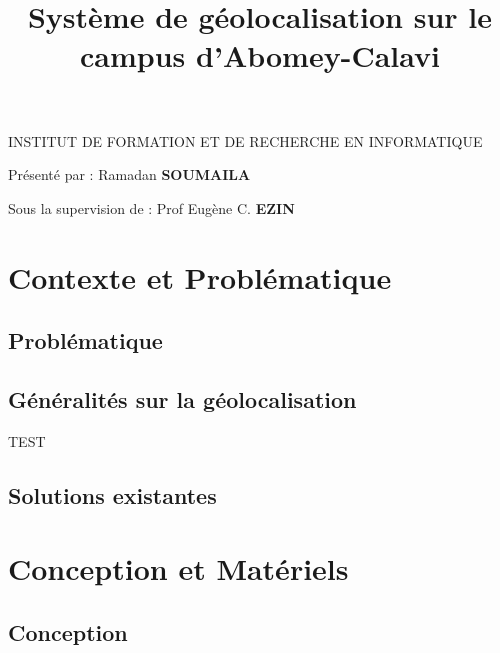 \documentclass[11pt]{beamer}
\author[Ramadan SOUMAILA]{}
\title{Système de géolocalisation sur le campus d'Abomey-Calavi}
\institute{}
\date{}
\begin{document}
\begin{frame}
	\begin{center}
		\begin{large}
			INSTITUT DE FORMATION ET DE RECHERCHE EN INFORMATIQUE
		\end{large}
	\end{center}
	\begin{center}
		\titlepage
	\end{center}
	\begin{center}
		Présenté par : Ramadan \textbf{SOUMAILA}
	\end{center}
	\begin{center}
		Sous la supervision de : Prof Eugène C. \textbf{EZIN}
	\end{center}
\end{frame}
	\section{Contexte et Problématique}
		\subsection{Problématique}
			\begin{frame}
			
			\end{frame}
		\subsection{Généralités sur la géolocalisation}
			\begin{frame}
					TEST
			\end{frame}
		\subsection{Solutions existantes}
			\begin{frame}
			
			\end{frame}
		
	\section{Conception et Matériels}
		\subsection{Conception}
			\begin{frame}
			
			\end{frame}
\end{document}
